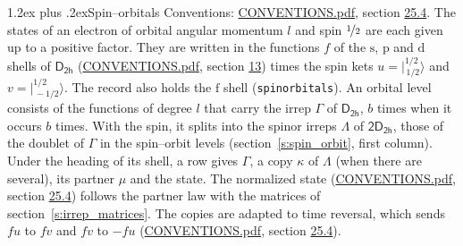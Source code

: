 \documentclass[10pt,a4paper]{article}
\makeatletter
\renewcommand\section{\@startsection{section}{1}{\z@}{-3ex plus -1ex minus -.2ex}%
  {1.2ex plus .2ex}{\normalfont\large\sffamily\bfseries\color{parttitle}}}
\numberwithin{equation}{section}
\newcommand{\grp}[1]{\mathsf{#1}}
\newcommand{\orbital}[1]{\mathrm{#1}}
\newcommand{\mult}{\kappa}
\newcommand{\intx}{\mu}
\newcommand{\jm}[2]{\bigl\lvert{}^{#1}_{\,#2}\bigr\rangle}
\makeatother
\begin{document}
\section{Spin--orbitals}\label{s:spin_orbitals}
Conventions: \href{../../CONVENTIONS.pdf}{CONVENTIONS.pdf}, section \href{../../CONVENTIONS.pdf\#conv.25.4}{25.4}.
\leavevmode\label{n:index.orbital.l}The states of an electron of orbital angular momentum $l$ and spin $\nicefrac{1}{2}$ are each given up to a positive factor. \label{n:local.spinor.uv}\label{n:local.function.f}They are written in the functions $f$ of the $\orbital{s}$, $\orbital{p}$ and $\orbital{d}$ shells of \href{../../../rotation/data/pdf/D2h.pdf}{$\grp{D_{2h}}$} (\href{../../CONVENTIONS.pdf}{CONVENTIONS.pdf}, section \href{../../../rotation/CONVENTIONS.pdf\#conv.13}{13}) times the spin kets $u = \jm{1/2}{1/2}$ and $v = \jm{1/2}{-1/2}$. The record also holds the $\orbital{f}$ shell (\texttt{spinorbitals}). An orbital level consists of the functions of degree $l$ that carry the irrep $\Gamma$ of \href{../../../rotation/data/pdf/D2h.pdf}{$\grp{D_{2h}}$}, $b$ times when it occurs $b$ times. With the spin, it splits into the spinor irreps $\Lambda$ of $\grp{2D_{2h}}$, those of the doublet of $\Gamma$ in the spin--orbit levels (section~\ref{s:spin_orbit}, first column). \label{n:head.state}Under the heading of its shell, a row gives $\Gamma$, a copy $\mult$ of $\Lambda$ (when there are several), its partner $\intx$ and the state. The normalized state (\href{../../CONVENTIONS.pdf}{CONVENTIONS.pdf}, section \href{../../CONVENTIONS.pdf\#conv.25.4}{25.4}) follows the partner law with the matrices of section~\ref{s:irrep_matrices}. The copies are adapted to time reversal, which sends $f u$ to $f v$ and $f v$ to $-f u$ (\href{../../CONVENTIONS.pdf}{CONVENTIONS.pdf}, section \href{../../CONVENTIONS.pdf\#conv.25.4}{25.4}).
\end{document}
